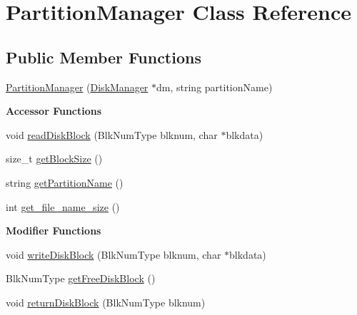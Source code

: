 \hypertarget{classPartitionManager}{}\section{Partition\+Manager Class Reference}
\label{classPartitionManager}
\subsection*{Public Member Functions}
\begin{DoxyCompactItemize}
\item 
\hyperlink{classPartitionManager_aa875b0b19b7ab9f32b02d2c9be383b75}{Partition\+Manager} (\hyperlink{classDiskManager}{Disk\+Manager} $\ast$dm, string partition\+Name)
\end{DoxyCompactItemize}
\begin{Indent}{\bf Accessor Functions}\par
\begin{DoxyCompactItemize}
\item 
void \hyperlink{classPartitionManager_a7aca34c24770b7b9290c489475655ada}{read\+Disk\+Block} (Blk\+Num\+Type blknum, char $\ast$blkdata)
\item 
size\+\_\+t \hyperlink{classPartitionManager_aa1026e17e77f154d7034fafd188bda02}{get\+Block\+Size} ()
\item 
string \hyperlink{classPartitionManager_a7c756dba2665e5a7b62b2ccb261f1158}{get\+Partition\+Name} ()
\item 
int \hyperlink{classPartitionManager_a3b047c1c63c2f9a9e04805471c04ccf0}{get\+\_\+file\+\_\+name\+\_\+size} ()
\end{DoxyCompactItemize}
\end{Indent}
\begin{Indent}{\bf Modifier Functions}\par
\begin{DoxyCompactItemize}
\item 
void \hyperlink{classPartitionManager_a114d5d4f8d90b6e9207b09d99e246bed}{write\+Disk\+Block} (Blk\+Num\+Type blknum, char $\ast$blkdata)
\item 
Blk\+Num\+Type \hyperlink{classPartitionManager_a682ce5963a31cf7009455cb1c229b26a}{get\+Free\+Disk\+Block} ()
\item 
void \hyperlink{classPartitionManager_a3ce9b50aa5e7d9063919fc55d125246b}{return\+Disk\+Block} (Blk\+Num\+Type blknum)
\end{DoxyCompactItemize}
\end{Indent}


